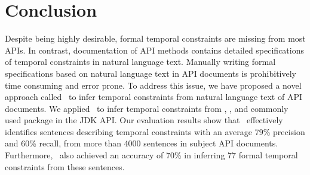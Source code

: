 \section{Conclusion}
\label{sec:conclusion}

Despite being highly desirable, formal temporal constraints are missing from most APIs.
In contrast, documentation of API methods contains detailed specifications of temporal constraints in natural language text.
Manually writing formal specifications based on natural language text in API documents is prohibitively time consuming and error prone.
To address this issue, we have proposed a novel approach called \tool\ to infer temporal constraints from natural language text of API documents.
We applied \tool\ to infer temporal constraints from
\paypalAPI, \amazonAPI, and  
commonly used package  in the JDK API.
Our evaluation results show that \tool\ effectively identifies sentences describing
temporal constraints with an average 79\% precision and 60\% recall,
from more than 4000 sentences in subject API documents.
Furthermore, \tool\ also achieved an accuracy of
70\% in inferring 77 formal temporal constraints from these sentences.